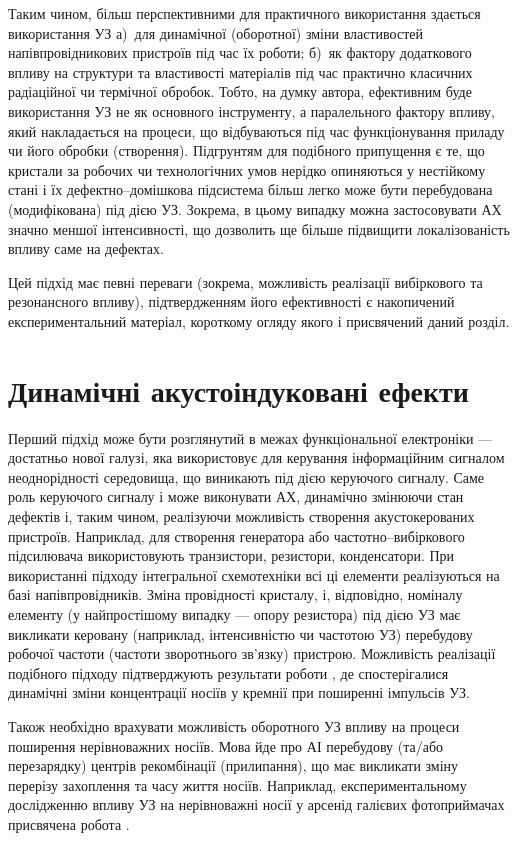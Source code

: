 Таким чином, більш перспективними для практичного використання здається використання УЗ
а)~для динамічної (оборотної) зміни властивостей напівпровідникових пристроїв під час їх роботи;
б)~як фактору додаткового впливу на структури та властивості матеріалів під час практично класичних радіаційної чи термічної обробок.
Тобто, на думку автора, ефективним буде використання УЗ не як основного інструменту, а паралельного фактору впливу, який накладається на процеси, що відбуваються під час функціонування приладу чи його обробки (створення).
Підгрунтям для подібного припущення є те, що кристали за  робочих чи технологічних умов нерідко опиняються у нестійкому стані і їх дефектно--домішкова підсистема більш легко може бути перебудована (модифікована) під дією УЗ.
Зокрема, в цьому випадку можна застосовувати АХ значно меншої інтенсивності,
що дозволить ще більше підвищити локалізованість впливу саме на дефектах.

Цей підхід має певні переваги (зокрема, можливість реалізації вибіркового та резонансного впливу),
підтвердженням його ефективності є накопичений експериментальний матеріал, короткому огляду якого і присвячений даний розділ.


\section{Динамічні акустоіндуковані ефекти}

Перший підхід може бути розглянутий в межах функціональної електроніки --- достатньо нової галузі,
яка використовує для керування інформаційним сигналом неоднорідності середовища,  що виникають під дією керуючого сигналу.
Саме роль керуючого сигналу і може виконувати АХ, динамічно змінюючи стан дефектів і, таким чином, реалізуючи можливість створення акустокерованих пристроїв.
Наприклад, для створення генератора або частотно--вибіркового підсилювача використовують транзистори, резистори, конденсатори.
При використанні підходу інтегральної схемотехніки всі ці елементи реалізуються на базі напівпровідників.
Зміна провідності кристалу, і, відповідно, номіналу елементу (у найпростішому випадку --- опору резистора) під дією УЗ
має викликати керовану (наприклад, інтенсивністю чи частотою УЗ) перебудову робочої частоти (частоти зворотнього зв'язку) пристрою.
Можливість реалізації подібного підходу підтверджують результати роботи \cite{YOlikhTPL2011r}, де спостерігалися динамічні зміни концентрації носіїв у кремнії при поширенні імпульсів УЗ.

Також необхідно врахувати можливість оборотного УЗ впливу на процеси поширення нерівноважних носіїв.
Мова йде про АІ перебудову (та/або перезарядку)  центрів рекомбінації (прилипання), що має викликати зміну перерізу захоплення та часу життя носіїв.
Наприклад, експериментальному дослідженню впливу УЗ на нерівноважні носії у арсенід галієвих фотоприймачах присвячена робота \cite{Zaveryukhin2002:2}.

